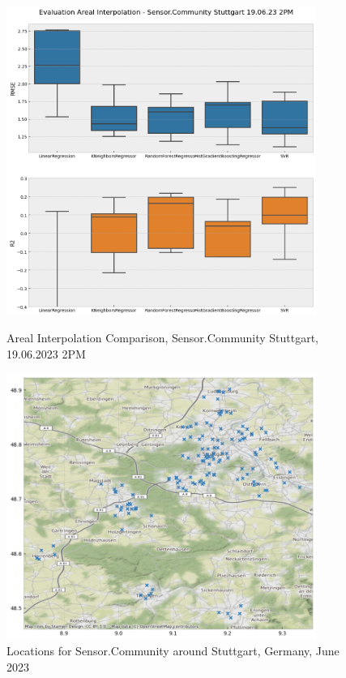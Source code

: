 
\begin{figure}[htp]
    \centering
    \includegraphics[width=0.9\textwidth]{images/eval areal interpolation 19.06.2023 14h.png}
    \caption{Areal Interpolation Comparison, Sensor.Community Stuttgart, 19.06.2023 2PM}
    \label{fig:eval areal interpolation 14h stuttgart}

    \includegraphics[width=0.9\textwidth]{images/sensor_community_locations_stuttgart_after_qc_june_23.png}
    \caption{Locations for Sensor.Community around Stuttgart, Germany, June 2023}
    \label{fig:qc sensor community stuttgart june 23}
\end{figure}

